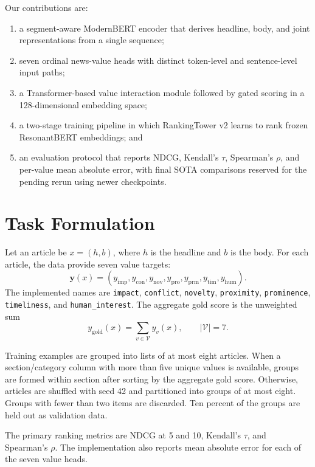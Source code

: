\documentclass[11pt]{article}
\begin{document}
Our contributions are:
\begin{enumerate}
    \item a segment-aware ModernBERT encoder that derives headline, body, and joint representations from a single sequence;
    \item seven ordinal news-value heads with distinct token-level and sentence-level input paths;
    \item a Transformer-based value interaction module followed by gated scoring in a 128-dimensional embedding space;
    \item a two-stage training pipeline in which RankingTower v2 learns to rank frozen ResonantBERT embeddings; and
    \item an evaluation protocol that reports NDCG, Kendall's $\tau$, Spearman's $\rho$, and per-value mean absolute error, with final SOTA comparisons reserved for the pending rerun using newer checkpoints.
\end{enumerate}

\section{Task Formulation}

Let an article be $x=(h,b)$, where $h$ is the headline and $b$ is the body. For each article, the data provide seven value targets:
\begin{equation}
    \mathbf{y}(x) = (y_{\mathrm{imp}}, y_{\mathrm{con}}, y_{\mathrm{nov}},
    y_{\mathrm{pro}}, y_{\mathrm{prm}}, y_{\mathrm{tim}}, y_{\mathrm{hum}}).
\end{equation}
The implemented names are \texttt{impact}, \texttt{conflict}, \texttt{novelty}, \texttt{proximity}, \texttt{prominence}, \texttt{timeliness}, and \texttt{human\_interest}. The aggregate gold score is the unweighted sum
\begin{equation}
    y_{\mathrm{gold}}(x) = \sum_{v \in \mathcal{V}} y_v(x),
    \qquad |\mathcal{V}|=7.
\end{equation}

Training examples are grouped into lists of at most eight articles. When a section/category column with more than five unique values is available, groups are formed within section after sorting by the aggregate gold score. Otherwise, articles are shuffled with seed 42 and partitioned into groups of at most eight. Groups with fewer than two items are discarded. Ten percent of the groups are held out as validation data.

The primary ranking metrics are NDCG at 5 and 10, Kendall's $\tau$, and Spearman's $\rho$. The implementation also reports mean absolute error for each of the seven value heads.
\end{document}
